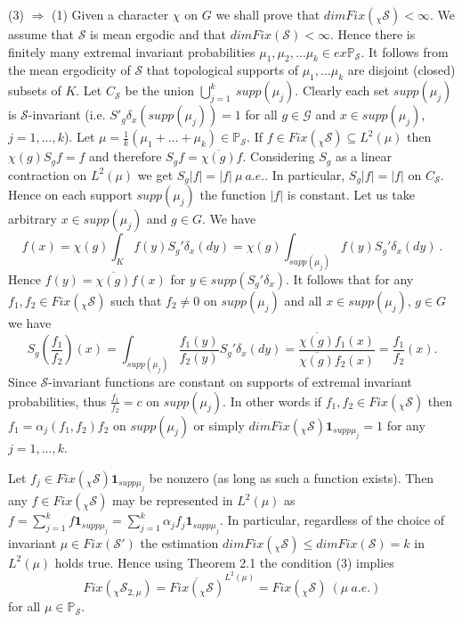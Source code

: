 \documentclass{amsart}
\theoremstyle{definition}
\theoremstyle{remark}
\numberwithin{equation}{section}
\begin{document}
(3) $ \Rightarrow$ (1) Given a character $\chi $ on $G$ we shall prove that $dim Fix(_{\chi}\mathcal{S}) < \infty$. We assume that $\mathcal{S}$ is mean ergodic and that $dim Fix(\mathcal{S}) < \infty$. Hence there is finitely many extremal invariant probabilities  $\mu_1, \mu_2, \dots \mu_k \in ex \mathbb{P}_{\mathcal{S}}$. It follows from the mean ergodicity of $\mathcal{S}$ that topological supports of $\mu_1, \dots \mu_k$ are disjoint (closed) subsets of $K$. Let $C_{\mathcal{S}}$ be the union $\bigcup_{j=1}^k \ supp(\mu _j)$. Clearly each set $supp(\mu_j)$ is $\mathcal{S}$-invariant (i.e. $S'_g \delta_x (supp (\mu_j)) = 1$ for all $g\mathcal{\in G}$ and $x\in supp(\mu_j)$, $j =1, ... , k$). Let $\mu = \frac{1}{k}(\mu_1 + ... + \mu_k) \in \mathbb{P}_{\mathcal{S}}$. If $f\in Fix(_{\chi}\mathcal{S})\subseteq L^2(\mu )$ then $\chi(g)S_gf = f $ and therefore $S_gf = \overline{\chi(g)}f$. Considering $S_g$ as a linear contraction on $L^2(\mu )$ we get $S_g|f| = |f| \ \mu \ a.e.$. In particular, $S_g|f| = |f|$ on  $C_{\mathcal{S}}$. Hence on each support $supp(\mu_j)$ the function $|f|$ is constant. Let us take arbitrary $x\in supp(\mu_j)$  and $g\in G$. We have
$$ f(x) =  \chi(g)\int_K f(y) S_g'\delta_x(dy) = \chi(g)\int_{supp(\mu_j)} f(y) S_g'\delta_x(dy) \ .$$
Hence $f(y) = \overline{\chi(g)}f(x)$ for $y \in supp(S_g'\delta_x)$. It follows that for  any $f_1, f_2 \in Fix(_{\chi}\mathcal{S})$ such that $f_2 \neq 0$ on $supp(\mu_j)$ and all $x\in supp(\mu_j)$, $g\in G$ we have
$$ S_g\left(\frac{f_1}{f_2}\right) (x) = \int_{supp(\mu_j)} \frac{f_1(y)}{f_2(y)} S_g'\delta_x(dy) = \frac{\overline{\chi(g)}f_1(x)}{\overline{\chi(g)}f_2(x)} = \frac{f_1}{f_2}(x).$$
Since $\mathcal{S}$-invariant functions are constant on supports of extremal invariant probabilities, thus $\frac{f_1}{f_2} = c$ on $supp(\mu_j)$. In other words if $f_1, f_2 \in Fix(_{\chi}\mathcal{S})$ then $f_1 = \alpha_j(f_1, f_2)f_2$ on $supp(\mu_j)$ or simply $dim Fix(_{\chi}\mathcal{S})\mathbf{1}_{supp \mu_j} = 1$ for any $j = 1, ... , k$.

Let $f_j\in Fix(_{\chi}\mathcal{S})\mathbf{1}_{supp \mu_j}$ be nonzero (as long as such a function exists). Then any $f\in Fix(_{\chi}\mathcal{S})$ may be represented in $L^2(\mu)$ as $f = \sum_{j=1}^k f \mathbf{1}_{supp \mu_j} = \sum_{j=1}^k \alpha_jf_j\mathbf{1}_{supp \mu_j}$. In particular, regardless of the choice of invariant $\mu \in Fix(\mathcal{S}')$ the estimation $dim Fix(_{\chi}\mathcal{S}) \leq dim Fix(\mathcal{S}) = k $ in $L^2(\mu )$ holds true. Hence using Theorem 2.1 the condition (3) implies
$$ Fix(_{\chi}\mathcal{S}_{2,\mu}) = \overline{Fix(_{\chi}\mathcal{S})}^{L^2(\mu)} = Fix(_{\chi}\mathcal{S}) \ (\mu \ a.e.) $$
for all $\mu \in \mathbb{P}_{\mathcal{S}}$.
\end{document}
